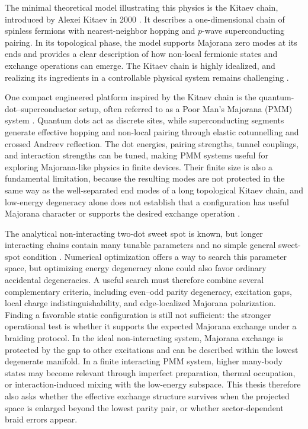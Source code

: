 The minimal theoretical model illustrating this physics is the Kitaev chain, introduced by Alexei Kitaev in 2000 \cite{kitaevUnpairedMajoranaFermions2001}. It describes a one-dimensional chain of spinless fermions with nearest-neighbor hopping and \(p\)-wave superconducting pairing. In its topological phase, the model supports Majorana zero modes at its ends and provides a clear description of how non-local fermionic states and exchange operations can emerge. The Kitaev chain is highly idealized, and realizing its ingredients in a controllable physical system remains challenging \cite{sanchesRevisitingPoorMans2026}.

One compact engineered platform inspired by the Kitaev chain is the quantum-dot--superconductor setup, often referred to as a Poor Man's Majorana (PMM) system \cite{sanchesRevisitingPoorMans2026,leijnseParityQubitsPoor2012}. Quantum dots act as discrete sites, while superconducting segments generate effective hopping and non-local pairing through elastic cotunnelling and crossed Andreev reflection. The dot energies, pairing strengths, tunnel couplings, and interaction strengths can be tuned, making PMM systems useful for exploring Majorana-like physics in finite devices. Their finite size is also a fundamental limitation, because the resulting modes are not protected in the same way as the well-separated end modes of a long topological Kitaev chain, and low-energy degeneracy alone does not establish that a configuration has useful Majorana character or supports the desired exchange operation \cite{zhangPoorMansMajorana2026}.

The analytical non-interacting two-dot sweet spot is known, but longer interacting chains contain many tunable parameters and no simple general sweet-spot condition \cite{svenssonQuantumDotBased2024}. Numerical optimization offers a way to search this parameter space, but optimizing energy degeneracy alone could also favor ordinary accidental degeneracies. A useful search must therefore combine several complementary criteria, including even--odd parity degeneracy, excitation gaps, local charge indistinguishability, and edge-localized Majorana polarization. Finding a favorable static configuration is still not sufficient: the stronger operational test is whether it supports the expected Majorana exchange under a braiding protocol. In the ideal non-interacting system, Majorana exchange is protected by the gap to other excitations and can be described within the lowest degenerate manifold. In a finite interacting PMM system, higher many-body states may become relevant through imperfect preparation, thermal occupation, or interaction-induced mixing with the low-energy subspace. This thesis therefore also asks whether the effective exchange structure survives when the projected space is enlarged beyond the lowest parity pair, or whether sector-dependent braid errors appear.


